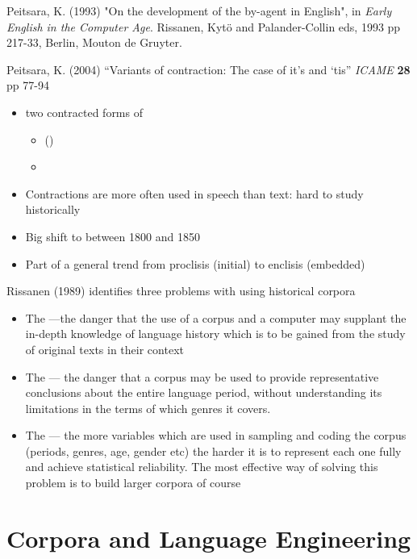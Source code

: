\documentclass[a4paper,landscape,headrule,footrule,xetex]{foils}
\begin{document}
Peitsara, K. (1993) "On the development of the by-agent in English", in \textit{Early English in the Computer Age}. Rissanen, Kytö and Palander-Collin eds, 1993 pp 217-33, Berlin, Mouton de Gruyter. 

Peitsara, K. (2004) ``Variants of contraction: The case of it’s and ‘tis'' \textit{ICAME} \textbf{28} pp 77-94

\begin{itemize}
\item two contracted forms of 
  \begin{itemize}
  \item {} ()
  \item {} 
  \end{itemize}
\item Contractions are more often used in speech than text: hard to study historically
\item Big shift to  between 1800 and 1850
\item Part of a general trend from proclisis (initial) to enclisis (embedded)
\end{itemize}

\MyLogo{}
Rissanen (1989) identifies three problems  with using historical corpora
\begin{itemize}
\item The  ---the danger that the use of a corpus and a computer may supplant the in-depth knowledge of language history which is to be gained from the study of original texts in their context
\item  The  --- the danger that a corpus may be used to provide representative conclusions about the entire language period, without understanding its limitations in the terms of which genres it covers.
\item The  --- the more variables which are used in sampling and coding the corpus (periods, genres, age, gender etc) the harder it is to represent each one fully and achieve statistical reliability. The most effective way of solving this problem is to build larger corpora of course
\end{itemize}



\section{Corpora and Language Engineering}
\end{document}

